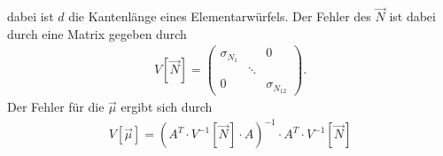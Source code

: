 dabei ist $d$ die Kantenlänge eines Elementarwürfels.
Der Fehler des $\vec{N}$ ist dabei durch eine Matrix gegeben durch
\begin{align}
	V[\vec{N}]=
	\begin{pmatrix}
		\sigma_{N_1} &  & 0\\
		 & \ddots & \\
		0 &  &\sigma_{N_{12}}	
	\end{pmatrix}.
\end{align}
Der Fehler für die $\vec{\mu}$ ergibt sich durch
\begin{align}
	V[\vec{\mu}]=\left(A^T\cdot V^{-1}[\vec{N}]\cdot A\right)^{-1}\cdot A^T\cdot V^{-1}[\vec{N}]
\end{align}